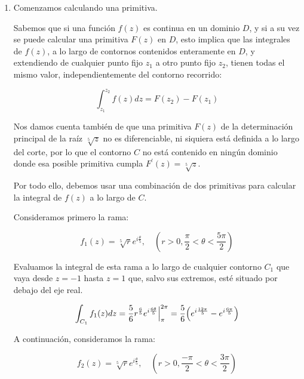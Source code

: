 \begin{enumerate}
    \vspace{20px}
    \item Comenzamos calculando una primitiva.

    Sabemos que si una función $f(z)$ es continua en un dominio $D$, y si a su vez se puede calcular una primitiva $F(z)$ en $D$,
    esto implica que las integrales de $f(z)$, a lo largo de contornos contenidos enteramente en $D$, y extendiendo de cualquier punto
    fijo $z_1$ a otro punto fijo $z_2$, tienen todas el mismo valor, independientemente del contorno recorrido:

    \begin{equation*}
        \int_{z_1}^{z_2} f(z)dz = F(z_2) - F(z_1)
    \end{equation*}

    Nos damos cuenta también de que una primitiva $F(z)$ de la determinación principal de la raíz $\sqrt[5]{z}$ no es diferenciable,
    ni siquiera está definida a lo largo del corte, por lo que el contorno $C$ no está contenido en ningún dominio donde
    esa posible primitiva cumpla $F^\prime(z) = \sqrt[5]{z}$.

    Por todo ello, debemos usar una combinación de dos primitivas para calcular la integral de $f(z)$ a lo largo de $C$.

    Consideramos primero la rama:

    \begin{equation*}
        f_1(z) = \sqrt[5]{r} e^{i\frac{\theta}{5}}, \hspace{12pt} (r> 0, \frac{\pi}{2} < \theta < \frac{5\pi}{2})
    \end{equation*}

    Evaluamos la integral de esta rama a lo largo de cualquier contorno $C_1$ que vaya desde $z = -1$ hasta $z = 1$ que,
    salvo sus extremos, esté situado por debajo del eje real.

    \begin{equation*}
        \int_{C_1} f_1(z) dz = \frac{5}{6} r^{\frac{6}{5}} e^{i\frac{6\theta}{5}} \Big|_\pi^{2\pi} =
        \frac{5}{6}\Bigl(e^{i\frac{12\pi}{5}} - e^{i\frac{6\pi}{5}} \Bigr)
    \end{equation*}

    A continuación, consideramos la rama:

    \begin{equation*}
        f_2(z) = \sqrt[5]{r} e^{i\frac{\theta}{5}}, \hspace{12pt} (r> 0, \frac{-\pi}{2} < \theta < \frac{3\pi}{2})
    \end{equation*}


\end{enumerate}
